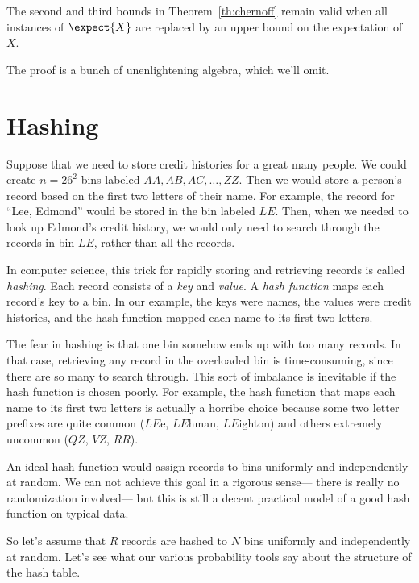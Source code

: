 \begin{editingnotes}
\begin{corollary}
\label{cor:chernoff}
The second and third bounds in Theorem~\ref{th:chernoff} remain valid
when all instances of $\expect{X}$ are replaced by an upper bound on the
expectation of $X$.
\end{corollary}

The proof is a bunch of unenlightening algebra, which we'll omit.

\section{Hashing}

Suppose that we need to store credit histories for a great many
people.  We could create $n = 26^2$ bins labeled $AA, AB, AC, \ldots,
ZZ$.  Then we would store a person's record based on the first two
letters of their name.  For example, the record for ``Lee, Edmond''
would be stored in the bin labeled $LE$.  Then, when we needed to look
up Edmond's credit history, we would only need to search through the
records in bin $LE$, rather than all the records.

In computer science, this trick for rapidly storing and retrieving
records is called \textit{hashing}.  Each record consists of a
\textit{key} and \textit{value}.  A \textit{hash function} maps each
record's key to a bin.  In our example, the keys were names, the
values were credit histories, and the hash function mapped each name
to its first two letters.

The fear in hashing is that one bin somehow ends up with too many
records.  In that case, retrieving any record in the overloaded bin is
time-consuming, since there are so many to search through.  This sort
of imbalance is inevitable if the hash function is chosen poorly.  For
example, the hash function that maps each name to its first two
letters is actually a horribe choice because some two letter prefixes
are quite common ($LE$e, $LE$hman, $LE$ighton) and others extremely
uncommon ($QZ$, $VZ$, $RR$).

An ideal hash function would assign records to bins uniformly and
independently at random.  We can not achieve this goal in a rigorous
sense--- there is really no randomization involved--- but this is
still a decent practical model of a good hash function on typical
data.

So let's assume that $R$ records are hashed to $N$ bins uniformly and
independently at random.  Let's see what our various probability tools
say about the structure of the hash table.


\end{editingnotes}
